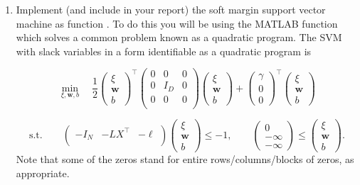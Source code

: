 \documentclass[11pt,noanswers,addpoints]{exam}
\newcommand{\w}{\mathbf w}
\begin{document}
\begin{enumerate}
\item Implement (and include in your report) the soft margin support vector machine as function . To do this you will be using the MATLAB function
 which solves a common problem known as a quadratic program. 
The SVM with slack variables in a form identifiable as a quadratic program is

$$\min_{\xi,\w,b} \quad \frac{1}{2}
\begin{pmatrix}
\xi \\ \w\\ b
\end{pmatrix}^\top
\begin{pmatrix}
0 & 0 & 0\\
0 & I_D & 0\\
0 & 0 & 0\\
\end{pmatrix}
\begin{pmatrix}
\xi \\
\w \\
b
\end{pmatrix} + 
\begin{pmatrix}
\gamma \\ 0 \\ 0
\end{pmatrix}^\top
\begin{pmatrix}
\xi \\
\w \\
b
\end{pmatrix}
$$

$$
\text{s.t.}\qquad \begin{pmatrix}
-I_N & -LX^\top & -\ell\\
\end{pmatrix}
\begin{pmatrix}
\xi \\
\w \\
b
\end{pmatrix} \leq -1,\qquad\begin{pmatrix}
0 \\
-\infty \\
-\infty 
\end{pmatrix} \leq 
\begin{pmatrix}
\xi \\
\w \\
b
\end{pmatrix}.$$
Note that some of the zeros stand for entire rows/columns/blocks of zeros, as appropriate.



\end{enumerate}
\end{document}
